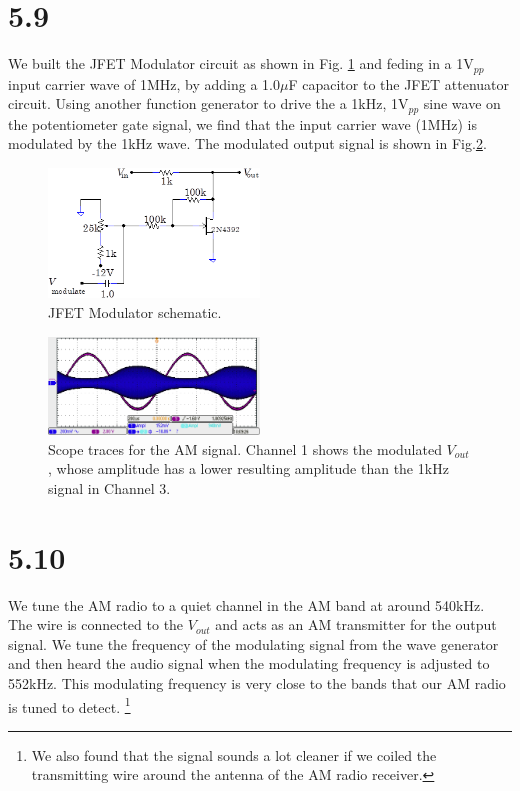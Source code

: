 \documentclass[authoryear, 12pt,5p, times]{elsarticle}
\begin{document}
 \section*{5.9}
We built the JFET Modulator circuit as shown in Fig. \ref{q9setup} and feding in a 1V$_{pp}$input carrier wave of 1MHz, by adding  a 1.0$\mu$F capacitor to the JFET attenuator circuit. Using another function generator to drive the a 1kHz, 1V$_{pp}$ sine wave on the potentiometer gate signal, we find that the input carrier wave (1MHz) is modulated by the 1kHz wave. The modulated output signal is shown in Fig.\ref{q9trace}.   
  \begin{figure}[h!]
 \centering
 \includegraphics[width=0.5\textwidth]{figure/q9setup}
\caption{JFET Modulator schematic.}
\label{q9setup}
 \end{figure}
 \begin{figure}[h!]
 \centering
 \includegraphics[width=0.5\textwidth]{figure/q9trace}
\caption{Scope traces for the AM signal. Channel 1 shows the modulated $V_{out}$, whose amplitude has a lower resulting amplitude than the 1kHz signal in Channel 3.}
\label{q9trace}
 \end{figure}
  \section*{5.10}
	We tune the AM radio to a quiet channel in the AM band at around 540kHz. The wire is connected to the $V_{out}$ and acts as an AM transmitter for the output signal. We tune the frequency of the modulating signal from the wave generator and then heard the audio signal when the modulating frequency is adjusted to 552kHz. This modulating frequency is very close to the bands that our AM radio is tuned to detect. \footnote{We also found that the signal sounds a lot cleaner if we coiled the transmitting wire around the antenna of the AM radio receiver.} 
\end{document}
